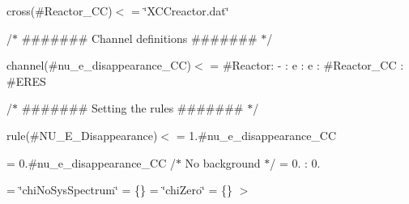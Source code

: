 cross(\#\+Reactor\+\_\+\+CC)$<$  = \char`\"{}\+X\+C\+Creactor.\+dat\char`\"{} \begin{quote}


\end{quote}


/$\ast$ \#\#\#\#\#\#\# Channel definitions \#\#\#\#\#\#\# $\ast$/

channel(\#nu\+\_\+e\+\_\+disappearance\+\_\+\+CC)$<$  = \#\+Reactor\+: -\/ \+: e \+: e \+: \#\+Reactor\+\_\+\+CC \+: \#\+E\+R\+ES \begin{quote}


\end{quote}


/$\ast$ \#\#\#\#\#\#\# Setting the rules \#\#\#\#\#\#\# $\ast$/

rule(\#\+N\+U\+\_\+\+E\+\_\+\+Disappearance)$<$  = 1.\#nu\+\_\+e\+\_\+disappearance\+\_\+\+CC

= 0.\#nu\+\_\+e\+\_\+disappearance\+\_\+\+CC /$\ast$ No background $\ast$/  = 0. \+: 0.

= \char`\"{}chi\+No\+Sys\+Spectrum\char`\"{}  = \{\}  = \char`\"{}chi\+Zero\char`\"{}  = \{\} $>$ 